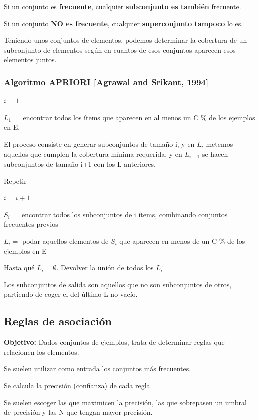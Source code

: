 \documentclass[12pt, twoside, openright]{report} %
\begin{document}
Si un conjunto es \textbf{frecuente}, cualquier \textbf{subconjunto es también} frecuente.

Si un conjunto \textbf{NO es frecuente}, cualquier \textbf{superconjunto tampoco} lo es.

Teniendo unos conjuntos de elementos, podemos determinar la cobertura de un subconjunto de elementos según en cuantos de esos conjuntos aparecen esos elementos juntos.
\pagebreak

\subsubsection{Algoritmo APRIORI [Agrawal and Srikant, 1994]}

$i = 1$

$L_1 =$ encontrar todos los ítems que aparecen en al menos un C \% de los ejemplos en E.

El proceso consiste en generar subconjuntos de tamaño i, y en $L_i$ metemos aquellos que cumplen la cobertura mínima requerida, y en $L_{i+1}$ se hacen subconjuntos de tamaño i+1 con los L anteriores.

Repetir

\hspace{6mm} $i = i + 1$

\hspace{6mm} $S_i =$ encontrar todos los subconjuntos de i ítems, combinando conjuntos frecuentes previos

\hspace{6mm} $L_i =$ podar aquellos elementos de $S_i$ que aparecen en menos de un C \% de los ejemplos en E

Hasta qué $L_i = \emptyset$. Devolver la unión de todos los $L_i$

Los subconjuntos de salida son aquellos que no son subconjuntos de otros, partiendo de coger el del último L no vacío.

\subsection{Reglas de asociación}
\textbf{Objetivo:} Dados conjuntos de ejemplos, trata de determinar reglas que relacionen los elementos.

Se suelen utilizar como entrada los conjuntos más frecuentes.

Se calcula la precisión (confianza) de cada regla.

Se suelen escoger las que maximicen la precisión, las que sobrepasen un umbral de precisión y las N que tengan mayor precisión.
\end{document}

